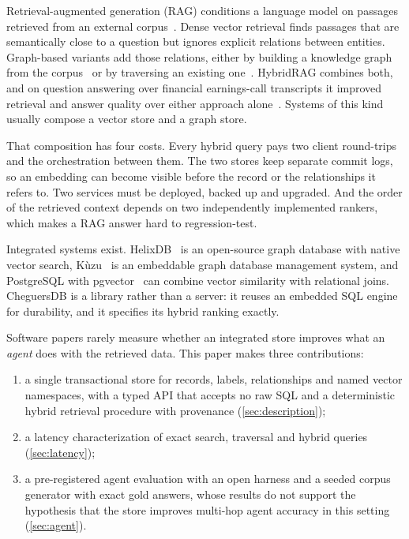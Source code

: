\documentclass[preprint,12pt,a4paper]{elsarticle}
\begin{document}
Retrieval-augmented generation (RAG) conditions a language model on passages retrieved from an external corpus~\cite{lewis2020rag}. Dense vector retrieval finds passages that are semantically close to a question but ignores explicit relations between entities. Graph-based variants add those relations, either by building a knowledge graph from the corpus~\cite{edge2024graphrag} or by traversing an existing one~\cite{peng2025graphrag}. HybridRAG combines both, and on question answering over financial earnings-call transcripts it improved retrieval and answer quality over either approach alone~\cite{sarmah2024hybridrag}. Systems of this kind usually compose a vector store and a graph store.

That composition has four costs. Every hybrid query pays two client round-trips and the orchestration between them. The two stores keep separate commit logs, so an embedding can become visible before the record or the relationships it refers to. Two services must be deployed, backed up and upgraded. And the order of the retrieved context depends on two independently implemented rankers, which makes a RAG answer hard to regression-test.

Integrated systems exist. HelixDB~\cite{helixdb} is an open-source graph database with native vector search, K\`uzu~\cite{feng2023kuzu} is an embeddable graph database management system, and PostgreSQL with pgvector~\cite{pgvector} can combine vector similarity with relational joins. CheguersDB is a library rather than a server: it reuses an embedded SQL engine for durability, and it specifies its hybrid ranking exactly.

Software papers rarely measure whether an integrated store improves what an \emph{agent} does with the retrieved data. This paper makes three contributions:
\begin{enumerate}
  \item a single transactional store for records, labels, relationships and named vector namespaces, with a typed API that accepts no raw SQL and a deterministic hybrid retrieval procedure with provenance (\cref{sec:description});
  \item a latency characterization of exact search, traversal and hybrid queries (\cref{sec:latency});
  \item a pre-registered agent evaluation with an open harness and a seeded corpus generator with exact gold answers, whose results do not support the hypothesis that the store improves multi-hop agent accuracy in this setting (\cref{sec:agent}).
\end{enumerate}
\end{document}
